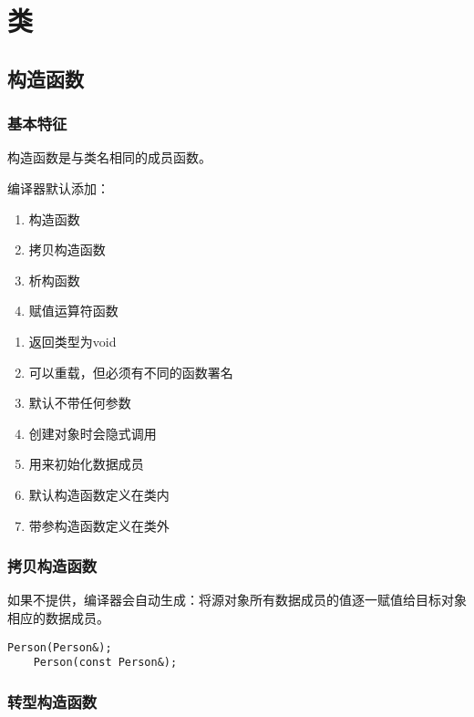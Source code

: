 \chapter{类}
\newpage

\section{构造函数}

\subsection{基本特征}

构造函数是与类名相同的成员函数。

编译器默认添加：
\begin{enumerate}
    \item 构造函数
    \item 拷贝构造函数
    \item 析构函数
    \item 赋值运算符函数
\end{enumerate}

\begin{enumerate}
    \item 返回类型为void
    \item 可以重载，但必须有不同的函数署名
    \item 默认不带任何参数
    \item 创建对象时会隐式调用
    \item 用来初始化数据成员
    \item 默认构造函数定义在类内
    \item 带参构造函数定义在类外
\end{enumerate}

\subsection{拷贝构造函数}

如果不提供，编译器会自动生成：将源对象所有数据成员的值逐一赋值给目标对象相应的数据成员。

\begin{lstlisting}[frame=shadowbox]
    Person(Person&);
    Person(const Person&);
\end{lstlisting}

\subsection{转型构造函数}

